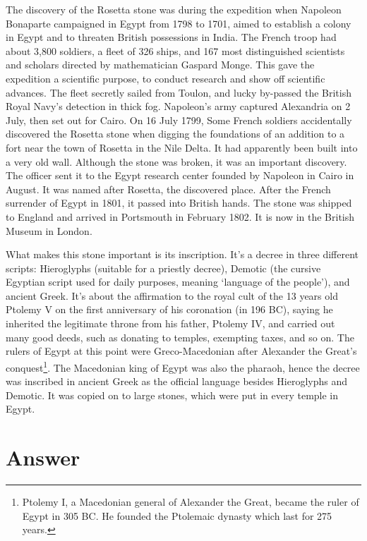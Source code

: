 \documentclass[b5paper]{article}
\begin{document}
The discovery of the Rosetta stone was during the expedition when Napoleon Bonaparte campaigned in Egypt from 1798 to 1701, aimed to establish a colony in Egypt and to threaten British possessions in India. The French troop had about 3,800 soldiers, a fleet of 326 ships, and 167 most distinguished scientists and scholars directed by mathematician Gaspard Monge\cite{Harrison-2023}. This gave the expedition a scientific purpose, to conduct research and show off scientific advances. The fleet secretly sailed from Toulon, and lucky by-passed the British Royal Navy's detection in thick fog. Napoleon's army captured Alexandria on 2 July, then set out for Cairo. On 16 July 1799, Some French soldiers accidentally discovered the Rosetta stone when digging the foundations of an addition to a fort near the town of Rosetta in the Nile Delta. It had apparently been built into a very old wall. Although the stone was broken, it was an important discovery. The officer sent it to the Egypt research center founded by Napoleon in Cairo in August. It was named after Rosetta, the discovered place. After the French surrender of Egypt in 1801, it passed into British hands. The stone was shipped to England and arrived in Portsmouth in February 1802. It is now in the British Museum in London.

What makes this stone important is its inscription. It's a decree in three different scripts: Hieroglyphs (suitable for a priestly decree), Demotic (the cursive Egyptian script used for daily purposes, meaning `language of the people'), and ancient Greek. It's about the affirmation to the royal cult of the 13 years old Ptolemy V on the first anniversary of his coronation (in 196 BC), saying he inherited the legitimate throne from his father, Ptolemy IV, and carried out many good deeds, such as donating to temples, exempting taxes, and so on. The rulers of Egypt at this point were Greco-Macedonian after Alexander the Great's conquest\footnote{Ptolemy I, a Macedonian general of Alexander the Great, became the ruler of Egypt in 305 BC. He founded the Ptolemaic dynasty which last for 275 years.}. The Macedonian king of Egypt was also the pharaoh, hence the decree was inscribed in ancient Greek as the official language besides Hieroglyphs and Demotic. It was copied on to large stones, which were put in every temple in Egypt.

\ifx\wholebook\relax \else
\section{Answer}
\shipoutAnswer
\end{document}
